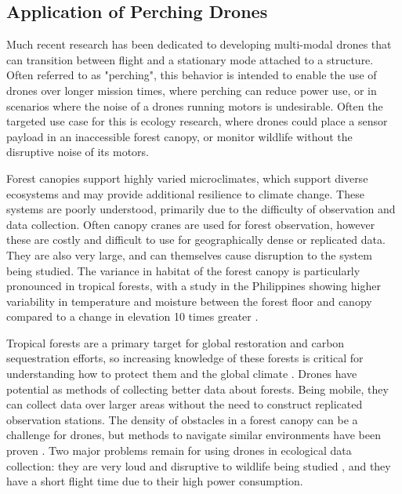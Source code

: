 \subsection{Application of Perching Drones}

Much recent research has been dedicated to developing multi-modal drones that can transition between flight
and a stationary mode attached to a structure. Often referred to as "perching", this behavior is intended
to enable the use of drones over longer mission times, where perching can reduce power use, or in scenarios
where the noise of a drones running motors is undesirable. Often the targeted use case for this is ecology research,
where drones could place a sensor payload in an inaccessible forest canopy, or monitor wildlife without the disruptive
noise of its motors. 

Forest canopies support highly varied microclimates, which support diverse ecosystems and may provide additional resilience to climate change.
These systems are poorly understood, primarily due to the difficulty of observation and data collection. Often canopy cranes are used for
forest observation, however these are costly and difficult to use for geographically dense or replicated data. They are also very large,
and can themselves cause disruption to the system being studied.
The variance in habitat of the forest canopy is particularly pronounced in tropical forests, with a study in the Philippines
showing higher variability in temperature and moisture between the forest floor and canopy compared to a change in elevation
10 times greater \cite{nakamura_forests_2017}.

Tropical forests are a primary target for global restoration and carbon sequestration efforts,
so increasing knowledge of these forests is critical for understanding how to protect them and the global climate \cite{mrema_ten_2020}.
Drones have potential as methods of collecting better data about forests. Being mobile, they can collect data over larger areas without the
need to construct replicated observation stations. The density of obstacles in a forest canopy can be a challenge for drones, but methods
to navigate similar environments have been proven \cite{mulgaonkar_robust_2018,tan_design_2017,liu_mini-drone_2023}. Two major problems
remain for using drones in ecological data collection: they are very loud and disruptive to wildlife being studied
\cite{jenni-eiermann_unmanned_2017,bennitt_terrestrial_2019},
and they have a short flight time due to their high power consumption.

